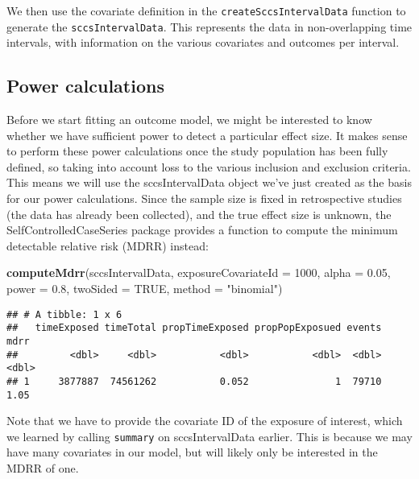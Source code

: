 \documentclass[
]{article}
\newenvironment{Shaded}{\begin{snugshade}}{\end{snugshade}}
\newcommand{\DataTypeTok}[1]{\textcolor[rgb]{0.13,0.29,0.53}{#1}}
\newcommand{\DecValTok}[1]{\textcolor[rgb]{0.00,0.00,0.81}{#1}}
\newcommand{\FloatTok}[1]{\textcolor[rgb]{0.00,0.00,0.81}{#1}}
\newcommand{\KeywordTok}[1]{\textcolor[rgb]{0.13,0.29,0.53}{\textbf{#1}}}
\newcommand{\NormalTok}[1]{#1}
\newcommand{\OtherTok}[1]{\textcolor[rgb]{0.56,0.35,0.01}{#1}}
\newcommand{\StringTok}[1]{\textcolor[rgb]{0.31,0.60,0.02}{#1}}
\begin{document}
We then use the covariate definition in the
\texttt{createSccsIntervalData} function to generate the
\texttt{sccsIntervalData}. This represents the data in non-overlapping
time intervals, with information on the various covariates and outcomes
per interval.

\hypertarget{power-calculations}{%
\subsection{Power calculations}\label{power-calculations}}

Before we start fitting an outcome model, we might be interested to know
whether we have sufficient power to detect a particular effect size. It
makes sense to perform these power calculations once the study
population has been fully defined, so taking into account loss to the
various inclusion and exclusion criteria. This means we will use the
sccsIntervalData object we've just created as the basis for our power
calculations. Since the sample size is fixed in retrospective studies
(the data has already been collected), and the true effect size is
unknown, the SelfControlledCaseSeries package provides a function to
compute the minimum detectable relative risk (MDRR) instead:

\begin{Shaded}
\begin{Highlighting}[]
\KeywordTok{computeMdrr}\NormalTok{(sccsIntervalData,}
            \DataTypeTok{exposureCovariateId =} \DecValTok{1000}\NormalTok{,}
            \DataTypeTok{alpha =} \FloatTok{0.05}\NormalTok{,}
            \DataTypeTok{power =} \FloatTok{0.8}\NormalTok{,}
            \DataTypeTok{twoSided =} \OtherTok{TRUE}\NormalTok{,}
            \DataTypeTok{method =} \StringTok{"binomial"}\NormalTok{)}
\end{Highlighting}
\end{Shaded}

\begin{verbatim}
## # A tibble: 1 x 6
##   timeExposed timeTotal propTimeExposed propPopExposued events  mdrr
##         <dbl>     <dbl>           <dbl>           <dbl>  <dbl> <dbl>
## 1     3877887  74561262           0.052               1  79710  1.05
\end{verbatim}

Note that we have to provide the covariate ID of the exposure of
interest, which we learned by calling \texttt{summary} on
sccsIntervalData earlier. This is because we may have many covariates in
our model, but will likely only be interested in the MDRR of one.
\end{document}
